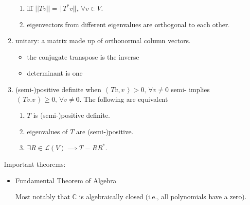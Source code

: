 \documentclass[11pt]{amsart}
\theoremstyle{definition}  %
\newcommand{\C}{\mathbb{C}}
\newcommand{\IP}[1]{\left \langle\, #1 \,\right \rangle}
\newcommand{\LL}{\mathcal{L}}
\begin{document}
\begin{enumerate}
\begin{enumerate}[label=\alph*)]
		\item iff $||Tv||=||T^*v||,\, \forall v \in V$.
		\item eigenvectors from different eigenvalues are orthogonal to each other.
	\end{enumerate}
	\item unitary: a matrix made up of orthonormal column vectors.
	\begin{itemize}
		\item the conjugate transpose is the inverse
		\item determinant is one
	\end{itemize}
	\item (semi-)positive definite when $\IP{Tv,v} > 0,\,\forall v\ne 0$ semi- implies $\IP{Tv.v} \ge 0,\,\forall v\ne 0$.  The following are equivalent
	\begin{enumerate}[label=\roman*)]
		\item $T$ is (semi-)positive definite.
		\item eigenvalues of $T$ are (semi-)positive.
		\item $\exists R \in \LL(V) \implies T=RR^*$.
	\end{enumerate}
\end{enumerate}

Important theorems:
\begin{itemize}
	\item Fundamental Theorem of Algebra
	
		Most notably that $\C$ is algebraically closed (i.e., all polynomials have a zero).
\end{itemize}
\end{document}
